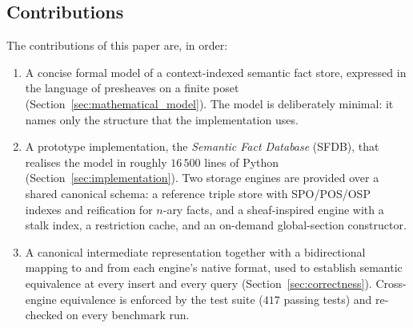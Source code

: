 \subsection*{Contributions}
\label{sec:contributions}

The contributions of this paper are, in order:

\begin{enumerate}
    \item A concise formal model of a context-indexed semantic fact store,
          expressed in the language of presheaves on a finite poset
          (Section~\ref{sec:mathematical_model}). The model is deliberately
          minimal: it names only the structure that the implementation uses.

    \item A prototype implementation, the \emph{Semantic Fact Database}
          (SFDB), that realises the model in roughly $16\,500$ lines of
          Python (Section~\ref{sec:implementation}). Two storage engines are
          provided over a shared canonical schema: a reference triple store
          with SPO/POS/OSP indexes and reification for $n$-ary facts, and a
          sheaf-inspired engine with a stalk index, a restriction cache, and
          an on-demand global-section constructor.

    \item A canonical intermediate representation together with a
          bidirectional mapping to and from each engine's native format,
          used to establish semantic equivalence at every insert and every
          query (Section~\ref{sec:correctness}). Cross-engine equivalence is
          enforced by the test suite ($417$ passing tests) and re-checked
          on every benchmark run.


\end{enumerate}
